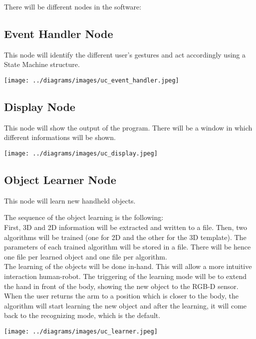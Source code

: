 \documentclass{article}
\begin{document}
There will be different nodes in the software:

\subsection{Event Handler Node}
	This node will identify the different user's gestures and act accordingly using a State Machine structure. 
	\begin{center}
		\texttt{[image: ../diagrams/images/uc\_event\_handler.jpeg]}
	\end{center}
	
\subsection{Display Node}
This node will show the output of the program. There will be a window in which different informations will be shown. 
	\begin{center}
		\texttt{[image: ../diagrams/images/uc\_display.jpeg]}
	\end{center}
\subsection{Object Learner Node}

\hspace{0.5cm}This node will learn new handheld objects. 

The sequence of the object learning is the following:
\\
First, 3D and 2D information will be extracted and written to a file. Then, two algorithms will be trained (one for 2D and the other for the 3D template). The parameters of each trained algorithm will be stored in a file. There will be hence one file per learned object and one file per algorithm.
\\

The learning of the objects will be done in-hand. This will allow a more intuitive interaction human-robot. The triggering of the learning mode will be to extend the hand in front of the body, showing the new object to the RGB-D sensor. When the user returns the arm to a position which is closer to the body, the algorithm will start learning the new object and after the learning, it will come back to the recognizing mode, which is the default. 

\begin{center}

		\texttt{[image: ../diagrams/images/uc\_learner.jpeg]}
	\end{center}
\end{document}
